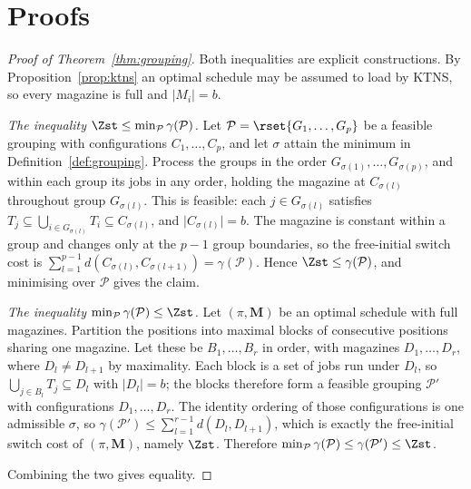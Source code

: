 \section{Proofs}\label{app:proofs}

\begin{proof}[Proof of Theorem~\ref{thm:grouping}]
Both inequalities are explicit constructions. By Proposition~\ref{prop:ktns} an
optimal schedule may be assumed to load by KTNS, so every magazine is full and
$\lvert M_i\rvert=b$.

\emph{The inequality $\Zst\le\min_{\mathcal{P}}\gamma(\mathcal{P})$.}
Let $\mathcal{P}=\rset{G_1,\dots,G_p}$ be a feasible grouping with configurations
$C_1,\dots,C_p$, and let $\sigma$ attain the minimum in
Definition~\ref{def:grouping}. Process the groups in the order
$G_{\sigma(1)},\dots,G_{\sigma(p)}$, and within each group its jobs in any order,
holding the magazine at $C_{\sigma(l)}$ throughout group $G_{\sigma(l)}$. This is
feasible: each $j\in G_{\sigma(l)}$ satisfies
$T_j\subseteq\bigcup_{i\in G_{\sigma(l)}}T_i\subseteq C_{\sigma(l)}$, and
$\lvert C_{\sigma(l)}\rvert=b$. The magazine is constant within a group and changes
only at the $p-1$ group boundaries, so the free-initial switch cost is
$\sum_{l=1}^{p-1}d(C_{\sigma(l)},C_{\sigma(l+1)})=\gamma(\mathcal{P})$. Hence
$\Zst\le\gamma(\mathcal{P})$, and minimising over $\mathcal{P}$ gives the claim.

\emph{The inequality $\min_{\mathcal{P}}\gamma(\mathcal{P})\le\Zst$.}
Let $(\pi,\mathbf{M})$ be an optimal schedule with full magazines. Partition the
positions into maximal blocks of consecutive positions sharing one magazine. Let these
be $B_1,\dots,B_r$ in order, with magazines $D_1,\dots,D_r$, where $D_l\ne D_{l+1}$ by
maximality. Each block is a set of jobs run under $D_l$, so
$\bigcup_{j\in B_l}T_j\subseteq D_l$ with $\lvert D_l\rvert=b$; the blocks therefore
form a feasible grouping $\mathcal{P}'$ with configurations $D_1,\dots,D_r$. The
identity ordering of those configurations is one admissible $\sigma$, so
$\gamma(\mathcal{P}')\le\sum_{l=1}^{r-1}d(D_l,D_{l+1})$, which is exactly the
free-initial switch cost of $(\pi,\mathbf{M})$, namely $\Zst$. Therefore
$\min_{\mathcal{P}}\gamma(\mathcal{P})\le\gamma(\mathcal{P}')\le\Zst$.

Combining the two gives equality.
\end{proof}

